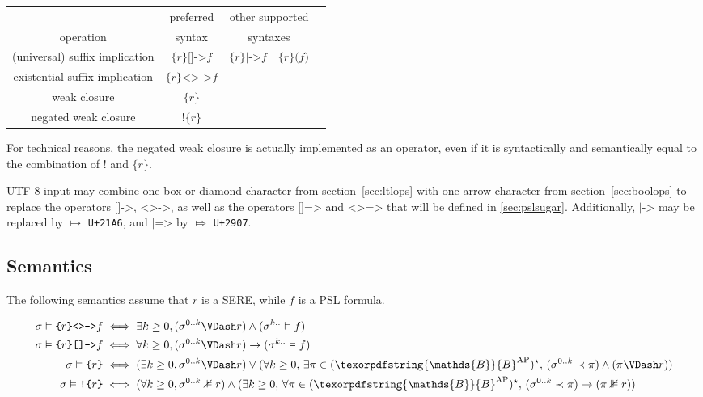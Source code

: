 \documentclass[a4paper,twoside,10pt,DIV=12]{scrreprt}
\newcommand{\uni}[1]{\texttt{\small U+#1}}
\newcommand{\B}{\texorpdfstring{\ensuremath{\mathds{B}}}{B}}
\newcommand{\AP}{\ensuremath{\mathrm{AP}}}
\DeclareMathOperator{\NOT}{\texttt{!}}
\newcommand{\0}{\texttt{0}}
\newcommand{\1}{\texttt{1}}
\newcommand{\Esuffix}{\texttt{<>->}}
\newcommand{\Asuffix}{\texttt{[]->}}
\newcommand{\AsuffixALT}{\texttt{|->}}
\newcommand{\EsuffixEQ}{\texttt{<>=>}}
\newcommand{\AsuffixEQ}{\texttt{[]=>}}
\newcommand{\AsuffixALTEQ}{\texttt{|=>}}
\newcommand{\sere}[1]{\texttt{\{}#1\texttt{\}}}
\newcommand{\nsere}[1]{\texttt{!\{}#1\texttt{\}}}
\def\limplies{\rightarrow}
\begin{document}
\begin{center}
\begin{tabular}{ccccc}
              & preferred & \multicolumn{2}{c}{other supported} \\
   operation  & syntax    & \multicolumn{2}{c}{syntaxes}\\
  \midrule
  (universal) suffix implication
  & $\sere{r}\Asuffix{} f$
  & $\sere{r}\AsuffixALT{} f$
  & $\sere{r}\texttt{(}f\texttt{)}$
  \\
  existential suffix implication
  & $\sere{r}\Esuffix{} f$
  \\
  weak closure
  & $\sere{r}$
  \\
  negated weak closure
  & $\nsere{r}$
  \\
\end{tabular}
\end{center}

For technical reasons, the negated weak closure is actually implemented as
an operator, even if it is syntactically and semantically equal to the
combination of $\NOT$ and $\sere{r}$.

UTF-8 input may combine one box or diamond character from
section~\ref{sec:ltlops} with one arrow character from
section~\ref{sec:boolops} to replace the operators $\Asuffix$,
$\Esuffix$, as well as the operators $\AsuffixEQ$ and $\EsuffixEQ$
that will be defined in \ref{sec:pslsugar}.  Additionally,
$\AsuffixALT$ may be replaced by $\mapsto$ \uni{21A6}, and
$\AsuffixALTEQ$ by $\Mapsto$ \uni{2907}.

\subsection{Semantics}

The following semantics assume that $r$ is a SERE,
while $f$ is a PSL formula.

\begin{align*}
  \sigma\vDash \sere{r}\Esuffix f &\iff \exists k\ge 0, (\sigma^{0..k}\VDash r)\land(\sigma^{k..}\vDash f)\\
  \sigma\vDash \sere{r}\Asuffix f &\iff \forall k\ge 0, (\sigma^{0..k}\VDash r)\limplies (\sigma^{k..}\vDash f)\\
  \sigma\vDash \sere{r} & \iff (\exists k\ge 0, \sigma^{0..k}\VDash r)\lor(\forall k\ge 0,\,\exists\pi\in(\B^\AP)^\star,\, (\sigma^{0..k}\prec \pi)\land(\pi\VDash r))\\
  \sigma\vDash \nsere{r} & \iff (\forall k\ge 0, \sigma^{0..k}\nVDash r)\land(\exists k\ge 0,\,\forall\pi\in(\B^\AP)^\star,\, (\sigma^{0..k}\prec \pi)\limplies(\pi\nVDash r))\\
\end{align*}
\end{document}
